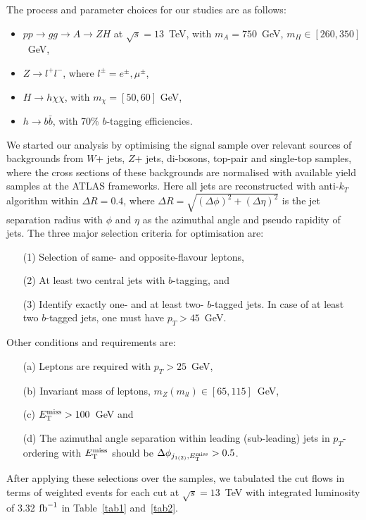 \documentclass[a4paper]{jpconf}
\begin{document}
The process and parameter choices for our studies are as follows:
\begin{itemize}
\item $p p \to g g \to A \to Z H$ at $\sqrt{s} = 13$~TeV, with $m_A = 750$~GeV, $m_H \in [260, 350]$~GeV,
\item $Z \to l^+ l^-$, where $l^\pm = e^\pm, \mu^\pm$,
\item $H \to h \chi\chi$, with $m_\chi = [50, 60]$ GeV,
\item $h \to b\bar b$, with 70\% $b$-tagging efficiencies.  
\end{itemize}
We started our analysis by optimising the signal sample over relevant sources of backgrounds from $W$+ jets, $Z$+ jets, di-bosons,
top-pair and single-top samples, where the cross sections of these backgrounds are normalised with available yield samples at the
ATLAS frameworks. Here all jets are reconstructed with anti-$k_T$ algorithm within $\Delta R = 0.4$, where 
$\Delta R = \sqrt{ \left( \Delta\phi \right)^2 + \left(\Delta\eta \right)^2 }$ is the jet separation radius with $\phi$ and $\eta$ as the
azimuthal angle and pseudo rapidity of jets. The three major selection criteria for optimisation are:
\begin{itemize}
\item[(1)] Selection of same- and opposite-flavour leptons,
\item[(2)] At least two central jets with $b$-tagging, and
\item[(3)] Identify exactly one- and at least two- $b$-tagged jets. In case of at least two $b$-tagged jets, one must have $p_T > 45$~GeV. 
\end{itemize}     
Other conditions and requirements are:
\begin{itemize}
\item[(a)] Leptons are required with $p_T > 25$~GeV,
\item[(b)] Invariant mass of leptons, $m_Z (m_{ll})\in [65, 115]$~GeV,
\item[(c)] $E_{\rm T}^{\rm miss} > 100$~GeV and
\item[(d)] The azimuthal angle separation within leading (sub-leading) jets in $p_T$-ordering with $E_{\rm T}^{\rm miss}$ should be
$\Delta\phi_{j_{1(2)}, E_{\rm T}^{\rm miss}} > 0.5$.   
\end{itemize}     
After applying these selections over the samples, we tabulated the cut flows in terms of weighted events for each cut at $\sqrt{s} = 13$~TeV with integrated luminosity of 3.32 ${\rm fb}^{-1}$ in Table~\ref{tab1} and~\ref{tab2}.  
\end{document}
